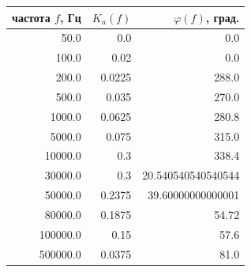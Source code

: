 \documentclass[10pt,a5paper]{article}
\begin{document}
\small
\begin{center}
\begin{tabular}{rrr}
\toprule
частота $f$, Гц & \hspace{1mm} $K_u(f)$ & \hspace{1mm} $\varphi(f)$, град. \\
\midrule
\num[round-mode=places,round-precision=0]{50.0} & \num[round-mode=places,round-precision=3]{0.0} & \num[round-mode=places,round-precision=3]{0.0} \\
\num[round-mode=places,round-precision=0]{100.0} & \num[round-mode=places,round-precision=3]{0.02} & \num[round-mode=places,round-precision=3]{0.0} \\
\num[round-mode=places,round-precision=0]{200.0} & \num[round-mode=places,round-precision=3]{0.0225} & \num[round-mode=places,round-precision=3]{288.0} \\
\num[round-mode=places,round-precision=0]{500.0} & \num[round-mode=places,round-precision=3]{0.035} & \num[round-mode=places,round-precision=3]{270.0} \\
\num[round-mode=places,round-precision=0]{1000.0} & \num[round-mode=places,round-precision=3]{0.0625} & \num[round-mode=places,round-precision=3]{280.8} \\
\num[round-mode=places,round-precision=0]{5000.0} & \num[round-mode=places,round-precision=3]{0.075} & \num[round-mode=places,round-precision=3]{315.0} \\
\num[round-mode=places,round-precision=0]{10000.0} & \num[round-mode=places,round-precision=3]{0.3} & \num[round-mode=places,round-precision=3]{338.4} \\
\num[round-mode=places,round-precision=0]{30000.0} & \num[round-mode=places,round-precision=3]{0.3} & \num[round-mode=places,round-precision=3]{20.540540540540544} \\
\num[round-mode=places,round-precision=0]{50000.0} & \num[round-mode=places,round-precision=3]{0.2375} & \num[round-mode=places,round-precision=3]{39.60000000000001} \\
\num[round-mode=places,round-precision=0]{80000.0} & \num[round-mode=places,round-precision=3]{0.1875} & \num[round-mode=places,round-precision=3]{54.72} \\
\num[round-mode=places,round-precision=0]{100000.0} & \num[round-mode=places,round-precision=3]{0.15} & \num[round-mode=places,round-precision=3]{57.6} \\
\num[round-mode=places,round-precision=0]{500000.0} & \num[round-mode=places,round-precision=3]{0.0375} & \num[round-mode=places,round-precision=3]{81.0} \\
\bottomrule
\end{tabular}
\end{center}
\end{document}
